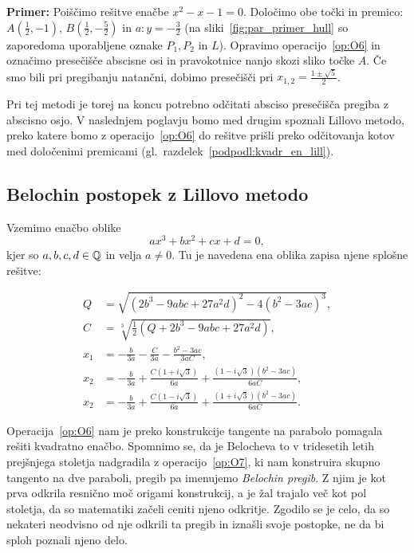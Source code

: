 \textbf{Primer:} Poiščimo rešitve enačbe $x^2 - x - 1 = 0$. Določimo obe točki in premico: $A(\frac{1}{2}, -1)$, $B(\frac{1}{2}, -\frac{5}{2})$ in $a: y = -\frac{3}{2}$ (na sliki~\ref{fig:par_primer_hull} so zaporedoma uporabljene oznake $P_1, P_2$ in $L$). Opravimo operacijo~\ref{op:O6} in označimo presečišče abscisne osi in pravokotnice nanjo skozi sliko točke $A$. Če smo bili pri pregibanju natančni, dobimo presečišči pri $x_{1,2} = \frac{1 \pm \sqrt{5}}{2}$.

Pri tej metodi je torej na koncu potrebno odčitati absciso presečišča pregiba z abscisno osjo. V naslednjem poglavju bomo med drugim spoznali Lillovo metodo, preko katere bomo z operacijo~\ref{op:O6} do rešitve prišli preko odčitovanja kotov med določenimi premicami (gl.\ razdelek~\ref{podpodl:kvadr_en_lill}).

\subsection{Belochin postopek z Lillovo metodo}
\label{podpogl:kubicna_enacba}

Vzemimo enačbo oblike
$$ a x^3 + b x^2 + c x + d = 0, $$
kjer so $a, b, c, d \in \mathbb Q$ in velja $a \neq 0$. Tu je navedena ena oblika zapisa njene splošne rešitve:

\begin{align*}
    Q &= \sqrt{(2b^3 - 9abc + 27a^2d)^2 - 4(b^2 - 3ac)^3}, \\
    C &= \sqrt[3]{\frac{1}{2}(Q + 2b^3 - 9abc + 27a^2d)}, \\
    x_1 &= - \frac{b}{3a} - \frac{C}{3a} - \frac{b^2 - 3ac}{3aC}, \\
    x_2 &= - \frac{b}{3a} + \frac{C(1 + i\sqrt{3})}{6a} + \frac{(1 - i\sqrt{3})(b^2 - 3ac)}{6aC}, \\
    x_2 &= - \frac{b}{3a} + \frac{C(1 - i\sqrt{3})}{6a} + \frac{(1 + i\sqrt{3})(b^2 - 3ac)}{6aC}.
\end{align*}

Operacija~\ref{op:O6} nam je preko konstrukcije tangente na parabolo pomagala rešiti kvadratno enačbo. Spomnimo se, da je Belocheva to v tridesetih letih prejšnjega stoletja nadgradila z operacijo~\ref{op:O7}, ki nam konstruira skupno tangento na dve paraboli, pregib pa imenujemo \emph{Belochin pregib}. Z njim je kot prva odkrila resnično moč origami konstrukcij, a je žal trajalo več kot pol stoletja, da so matematiki začeli ceniti njeno odkritje. Zgodilo se je celo, da so nekateri neodvisno od nje odkrili ta pregib in iznašli svoje postopke, ne da bi sploh poznali njeno delo.

